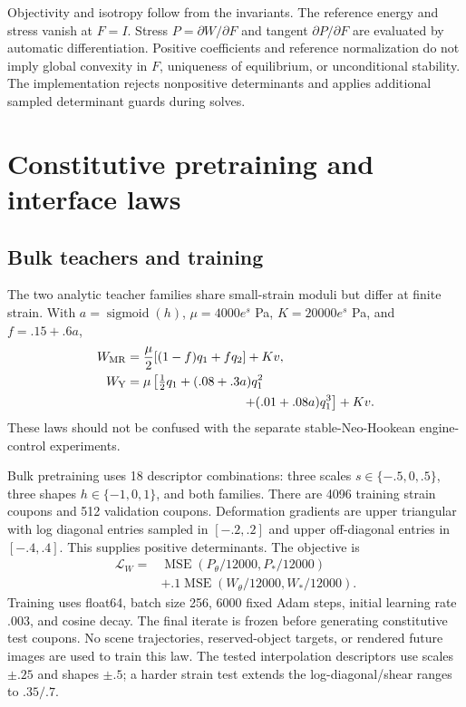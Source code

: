 \documentclass[10pt,twocolumn,letterpaper]{article}
\begin{document}
Objectivity and isotropy follow from the invariants. The reference energy and stress vanish at $F=I$. Stress $P=\partial W/\partial F$ and tangent $\partial P/\partial F$ are evaluated by automatic differentiation. Positive coefficients and reference normalization do not imply global convexity in $F$, uniqueness of equilibrium, or unconditional stability. The implementation rejects nonpositive determinants and applies additional sampled determinant guards during solves.

\section{Constitutive pretraining and interface laws}
\subsection{Bulk teachers and training}
The two analytic teacher families share small-strain moduli but differ at finite strain. With $a=\operatorname{sigmoid}(h)$, $\mu=4000e^s$ Pa, $K=20000e^s$ Pa, and $f=.15+.6a$,
\begin{align}
 W_{\rm MR}&=\frac{\mu}{2}[(1-f)q_1+fq_2]+Kv,\\
 W_{\rm Y}&=\mu\left[\tfrac12q_1+(.08+.3a)q_1^2\right.\nonumber\\
 &\hspace{32mm}\left.+(.01+.08a)q_1^3\right]+Kv.
\end{align}
These laws should not be confused with the separate stable-Neo-Hookean engine-control experiments.

Bulk pretraining uses 18 descriptor combinations: three scales $s\in\{-.5,0,.5\}$, three shapes $h\in\{-1,0,1\}$, and both families. There are 4096 training strain coupons and 512 validation coupons. Deformation gradients are upper triangular with log diagonal entries sampled in $[-.2,.2]$ and upper off-diagonal entries in $[-.4,.4]$. This supplies positive determinants. The objective is
\begin{equation}
\begin{aligned}
 \mathcal L_W={}&\operatorname{MSE}(P_\theta/12000,P_*/12000)\\
 &+.1\operatorname{MSE}(W_\theta/12000,W_*/12000).
\end{aligned}
\end{equation}
Training uses float64, batch size 256, 6000 fixed Adam steps, initial learning rate $.003$, and cosine decay. The final iterate is frozen before generating constitutive test coupons. No scene trajectories, reserved-object targets, or rendered future images are used to train this law. The tested interpolation descriptors use scales $\pm.25$ and shapes $\pm.5$; a harder strain test extends the log-diagonal/shear ranges to $.35/.7$.
\end{document}
